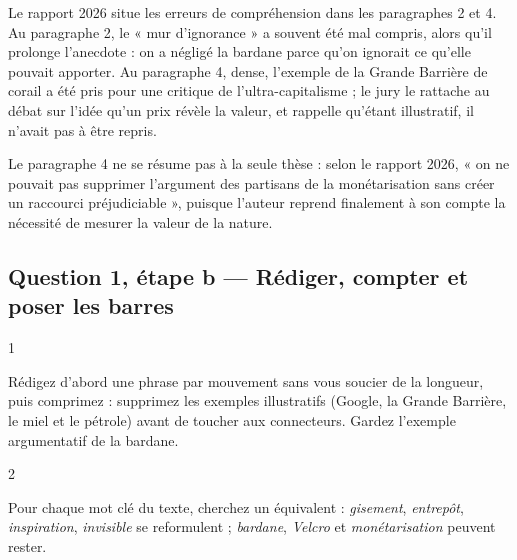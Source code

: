 \documentclass[11pt,a4paper]{article}
\begin{document}
\begin{piege}

Le rapport 2026 situe les erreurs de compréhension dans les paragraphes 2 et 4. Au paragraphe 2, le « mur d'ignorance » a souvent été mal compris, alors qu'il prolonge l'anecdote : on a négligé la bardane parce qu'on ignorait ce qu'elle pouvait apporter. Au paragraphe 4, dense, l'exemple de la Grande Barrière de corail a été pris pour une critique de l'ultra-capitalisme ; le jury le rattache au débat sur l'idée qu'un prix révèle la valeur, et rappelle qu'étant illustratif, il n'avait pas à être repris.

\end{piege}

\begin{jury}

Le paragraphe 4 ne se résume pas à la seule thèse : selon le rapport 2026, « on ne pouvait pas supprimer l'argument des partisans de la monétarisation sans créer un raccourci préjudiciable », puisque l'auteur reprend finalement à son compte la nécessité de mesurer la valeur de la nature.

\end{jury}

\hypertarget{question-1-uxe9tape-b-ruxe9diger-compter-et-poser-les-barres}{%
\subsection{Question 1, étape b --- Rédiger, compter et poser les barres}\label{question-1-uxe9tape-b-ruxe9diger-compter-et-poser-les-barres}}

\begin{indication}{1}

Rédigez d'abord une phrase par mouvement sans vous soucier de la longueur, puis comprimez : supprimez les exemples illustratifs (Google, la Grande Barrière, le miel et le pétrole) avant de toucher aux connecteurs. Gardez l'exemple argumentatif de la bardane.

\end{indication}

\begin{indication}{2}

Pour chaque mot clé du texte, cherchez un équivalent : \emph{gisement}, \emph{entrepôt}, \emph{inspiration}, \emph{invisible} se reformulent ; \emph{bardane}, \emph{Velcro} et \emph{monétarisation} peuvent rester.

\end{indication}
\end{document}
